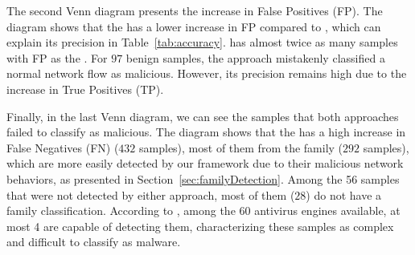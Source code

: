 The second Venn diagram presents the increase in False Positives (FP). The diagram shows that the \mas has a lower increase in FP compared to \droidxpflow, which can explain its precision in Table~\ref{tab:accuracy}. \droidxpflow has almost twice as many samples with FP as the \mas. For $97$ benign samples, the approach mistakenly classified a normal network flow as malicious. However, its precision remains high due to the increase in True Positives (TP).

Finally, in the last Venn diagram, we can see the samples that both approaches failed to classify as malicious. The diagram shows that the \mas has a high increase in False Negatives (FN) ($432$ samples), most of them from the \gps family ($292$ samples), which are more easily detected by our framework due to their malicious network behaviors, as presented in Section~\ref{sec:familyDetection}. Among the 56 samples that were not detected by either approach, most of them ($28$) do not have a family classification. According to \vt, among the 60 antivirus engines available, at most 4 are capable of detecting them, characterizing these samples as complex and difficult to classify as malware.


